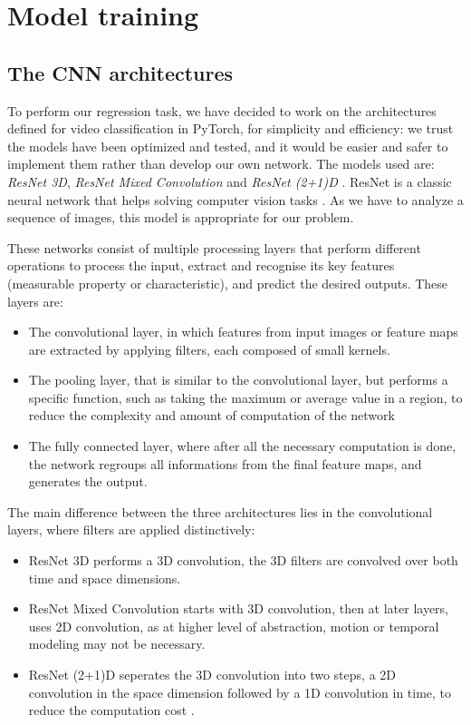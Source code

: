 \documentclass[10pt,conference]{IEEEtran}
\begin{document}
\section{Model training}
 
\subsection{The CNN architectures}
To perform our regression task, we have decided to work on the architectures defined for video classification in PyTorch, for simplicity and efficiency: we trust the models have been optimized and tested, and it would be easier and safer to implement them rather than develop our own network. The models used are: \textit{ResNet 3D}, \textit{ResNet Mixed Convolution} and \textit{ResNet (2+1)D} \cite{resnets}. ResNet is a classic neural network that helps solving computer vision tasks \cite{hara3dcnns}. As we have to analyze a sequence of images, this model is appropriate for our problem.\par
These networks consist of multiple processing layers that perform different operations to process the input, extract and recognise its key features (measurable property or characteristic), and predict the desired outputs. These layers are:
\begin{itemize}
  \item The convolutional layer, in which features from input images or feature maps are extracted by applying filters, each composed of small kernels.
  \item The pooling layer, that is similar to the convolutional layer, but performs a specific function, such as taking the maximum or average value in a region, to reduce the complexity and amount of computation of the network 
  \item The fully connected layer, where after all the necessary computation is done, the network regroups all informations from the final feature maps, and generates the output.
\end{itemize}

The main difference between the three architectures lies in the convolutional layers, where filters are applied distinctively:
\begin{itemize}
  \item ResNet 3D performs a 3D convolution, the 3D filters are convolved over both time and space dimensions.
  \item ResNet Mixed Convolution starts with 3D convolution, then at later layers, uses 2D convolution, as at higher level of abstraction, motion or temporal modeling may not be necessary.
  \item ResNet (2+1)D seperates the 3D convolution into two steps, a 2D convolution in the space dimension followed by a 1D convolution in time, to reduce the computation cost \cite{spacetimeconv}.
\end{itemize}
\end{document}
